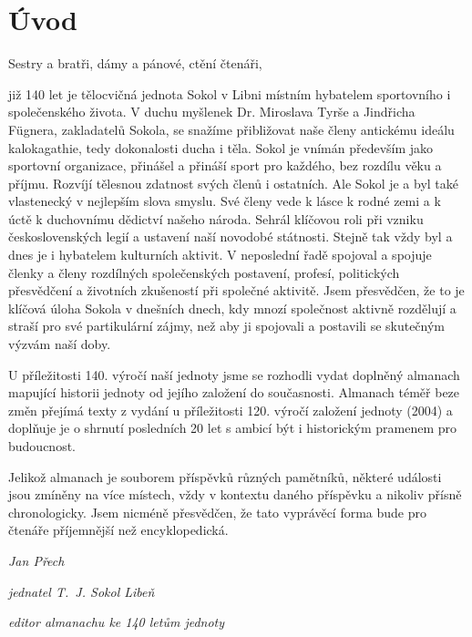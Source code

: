 \documentclass[a5paper, 11pt, twoside]{article}
\begin{document}
\cleardoublepage


\setlength{\parskip}{0pt}

\section{Úvod}

Sestry a bratři, dámy a pánové, ctění čtenáři,

\noindent již 140 let je tělocvičná jednota Sokol v Libni místním hybatelem
sportovního i společenského života. V duchu myšlenek Dr. Miroslava Tyrše
a Jindřicha Fügnera, zakladatelů Sokola, se snažíme přibližovat naše
členy antickému ideálu kalokagathie, tedy dokonalosti ducha i těla.
Sokol je vnímán především jako sportovní organizace, přinášel a přináší
sport pro každého, bez rozdílu věku a příjmu. Rozvíjí tělesnou zdatnost
svých členů i ostatních. Ale Sokol je a byl také vlastenecký v nejlepším
slova smyslu. Své členy vede k lásce k rodné zemi a k úctě k duchovnímu
dědictví našeho národa. Sehrál klíčovou roli při vzniku československých
legií a ustavení naší novodobé státnosti. Stejně tak vždy byl a dnes je
i hybatelem kulturních aktivit. V neposlední řadě spojoval a spojuje
členky a členy rozdílných společenských postavení, profesí, politických
přesvědčení a životních zkušeností při společné aktivitě. Jsem
přesvědčen, že to je klíčová úloha Sokola v dnešních dnech, kdy mnozí
společnost aktivně rozdělují a straší pro své partikulární zájmy, než
aby ji spojovali a postavili se skutečným výzvám naší doby.

U příležitosti 140. výročí naší jednoty jsme se rozhodli vydat doplněný
almanach mapující historii jednoty od jejího založení do současnosti.
Almanach téměř beze změn přejímá texty z vydání u příležitosti 120.
výročí založení jednoty (2004) a doplňuje je o shrnutí posledních 20 let
s ambicí být i historickým pramenem pro budoucnost.

Jelikož almanach je souborem příspěvků různých pamětníků, některé
události jsou zmíněny na více místech, vždy v kontextu daného příspěvku
a nikoliv přísně chronologicky. Jsem nicméně přesvědčen, že tato
vyprávěcí forma bude pro čtenáře příjemnější než encyklopedická.

\vspace{\baselineskip}
\hfill\textit{Jan Přech}

\hfill\textit{jednatel T.~J. Sokol Libeň}

\hfill\textit{editor almanachu ke 140 letům jednoty}
\end{document}
